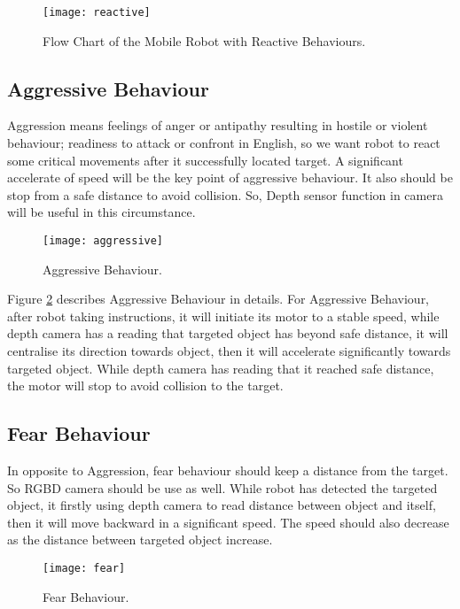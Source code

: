 \begin{figure}
\centering
\texttt{[image: reactive]}
\caption{Flow Chart of the Mobile Robot with Reactive Behaviours.}
\label{fig:reactive}
\end{figure}

\subsection{Aggressive Behaviour}

Aggression means feelings of anger or antipathy resulting in hostile or violent behaviour; readiness to attack or confront in English, so we want robot to react some critical movements after it successfully located target. A significant accelerate of speed will be the key point of aggressive behaviour. It also should be stop from a safe distance to avoid collision. So, Depth sensor function in camera will be useful in this circumstance.

\begin{figure}
\centering
\texttt{[image: aggressive]}
\caption{Aggressive Behaviour.}
\label{fig:aggressive}
\end{figure}

Figure \ref{fig:aggressive} describes Aggressive Behaviour in details.
For Aggressive Behaviour, after robot taking instructions, it will initiate its motor to a stable speed, while depth camera has a reading that targeted object has beyond safe distance, it will centralise its direction towards object, then it will accelerate significantly towards targeted object. While depth camera has reading that it reached safe distance, the motor will stop to avoid collision to the target.

\subsection{Fear Behaviour}

In opposite to Aggression, fear behaviour should keep a distance from the target. So RGBD camera should be use as well. While robot has detected the targeted object, it firstly using depth camera to read distance between object and itself, then it will move backward in a significant speed. The speed should also decrease as the distance between targeted object increase.

\begin{figure}
\centering
\texttt{[image: fear]}
\caption{Fear Behaviour.}
\label{fig:fear}
\end{figure}


